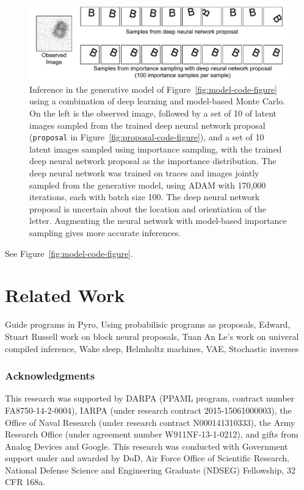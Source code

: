 \documentclass{article}
\begin{document}
\begin{figure}[h]
\centering
    \includegraphics[width=1.0\textwidth]{images/deep-neural-network-is.pdf}
    \caption{
Inference in the generative model of Figure~\ref{fig:model-code-figure} using a combination of deep learning and model-based Monte Carlo.
On the left is the observed image, followed by a set of 10 of latent images sampled from the trained deep neural network proposal (\texttt{proposal} in Figure~\ref{fig:proposal-code-figure}), and a set of 10 latent images sampled using importance sampling, with the trained deep neural network proposal as the importance distribution.
The deep neural network was trained on traces and images jointly sampled from the generative model, using ADAM with 170,000 iterations, each with batch size 100.
The deep neural network proposal is uncertain about the location and orientiation of the letter.
Augmenting the neural network with model-based importance sampling gives more accurate inferences.
}
    \label{fig:example-results}
\end{figure}

See Figure~\ref{fig:model-code-figure}.


\section{Related Work}
Guide programs in Pyro,
Using probabilisic programs as proposals,
Edward,
Stuart Russell work on block neural proposals,
Tuan An Le's work on univeral compiled inference,
Wake sleep,
Helmholtz machines,
VAE,
Stochastic inverses

\subsubsection*{Acknowledgments}
This research was supported by DARPA (PPAML program, contract number FA8750-14-2-0004), IARPA (under research contract 2015-15061000003), the Office of Naval Research (under research contract N000141310333), the Army Research Office (under agreement number W911NF-13-1-0212), and gifts from Analog Devices and Google.
This research was conducted with Government support under and awarded by DoD, Air Force Office of Scientific Research, National Defense Science and Engineering Graduate (NDSEG) Fellowship, 32 CFR 168a.



\end{document}
